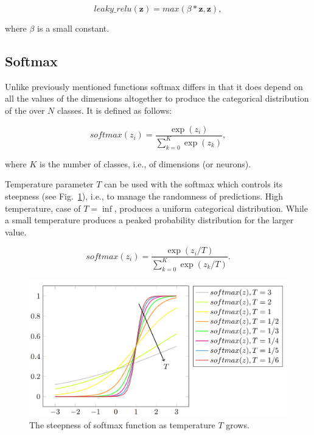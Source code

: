 \begin{equation}\label{eq:lrelu}
    leaky\_relu(\mathbf{z}) = max(\beta*\mathbf{z}, \mathbf{z}),
\end{equation}

\noindent where $\beta$ is a small constant.

\subsection{Softmax}\label{sec:softmax}
 Unlike previously mentioned functions softmax \cite{lecun1989handwritten} differs in that it does depend on all the values of the dimensions altogether to produce the categorical distribution of the over $N$ classes. It is defined as follows\cite{simonyan2014very}:

\begin{equation}\label{eq:softmax}
    softmax(z_i) = \frac{\exp(z_i)}{\sum_{k=0}^K{\exp(z_k)}},
\end{equation}

\noindent where $K$ is the number of classes, i.e., of dimensions (or neurons).

Temperature parameter $T$ \cite{hinton2015distilling} can be used with the softmax which controls its steepness (see Fig.~\ref{fig:softmax}), i.e., to manage the randomness of predictions. High temperature, case of $T = \inf$, produces a uniform categorical distribution. While a small temperature produces a peaked probability distribution for the larger value\cite{hinton2015distilling}.


\begin{equation}\label{eq:softmax_tmp}
    softmax(z_i) = \frac{\exp(z_i / T)}
    {\sum_{k=0}^K{\exp(z_k / T)}}.
\end{equation}

\begin{figure}[t]
    \centering
    \includegraphics[width=\textwidth]{Figures/Softmaxbehaviour.png}
    \caption{The steepness of softmax function as temperature $T$ grows.}\label{fig:softmax}
\end{figure}

